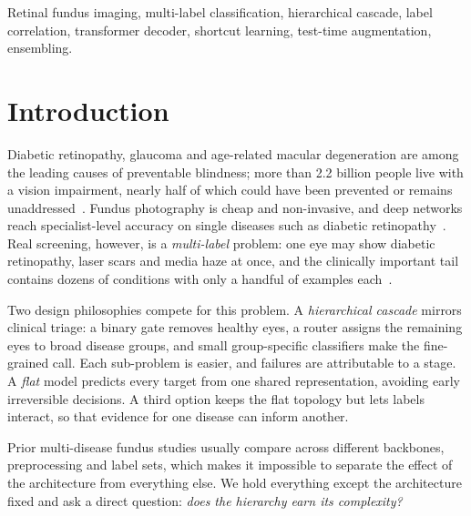 \documentclass[conference]{IEEEtran}
\begin{document}
\begin{IEEEkeywords}
Retinal fundus imaging, multi-label classification, hierarchical cascade,
label correlation, transformer decoder, shortcut learning, test-time augmentation,
ensembling.
\end{IEEEkeywords}

\section{Introduction}
Diabetic retinopathy, glaucoma and age-related macular degeneration are among the
leading causes of preventable blindness; more than 2.2 billion people live with a
vision impairment, nearly half of which could have been prevented or remains
unaddressed~\cite{who2019}. Fundus photography is cheap and non-invasive, and deep
networks reach specialist-level accuracy on single diseases such as diabetic
retinopathy~\cite{gulshan2016,ting2017}. Real screening, however, is a
\emph{multi-label} problem: one eye may show diabetic retinopathy, laser scars and
media haze at once, and the clinically important tail contains dozens of conditions
with only a handful of examples each~\cite{pachade2021,cen2021}.

Two design philosophies compete for this problem. A \emph{hierarchical cascade}
mirrors clinical triage: a binary gate removes healthy eyes, a router assigns the
remaining eyes to broad disease groups, and small group-specific classifiers make
the fine-grained call. Each sub-problem is easier, and failures are attributable to
a stage. A \emph{flat} model predicts every target from one shared representation,
avoiding early irreversible decisions. A third option keeps the flat topology but
lets labels interact, so that evidence for one disease can inform another.

Prior multi-disease fundus studies usually compare across different backbones,
preprocessing and label sets, which makes it impossible to separate the effect of
the architecture from everything else. We hold everything except the architecture
fixed and ask a direct question: \emph{does the hierarchy earn its complexity?}
\end{document}
